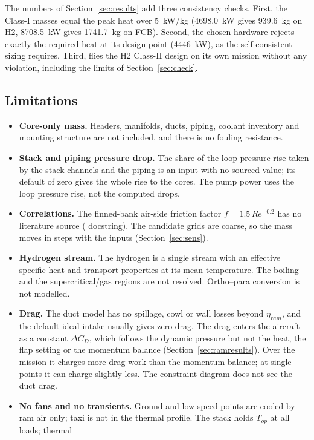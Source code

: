 \documentclass[a4paper,11pt]{article}
\begin{document}
The numbers of Section~\ref{sec:results} add three consistency checks. First, the Class-I
masses equal the peak heat over \SI{5}{kW/kg} (\SI{4698.0}{kW} gives \SI{939.6}{kg} on H2,
\SI{8708.5}{kW} gives \SI{1741.7}{kg} on FCB). Second, the chosen hardware rejects exactly
the required heat at its design point (\SI{4446}{kW}), as the self-consistent sizing
requires. Third,  flies the H2 Class-II design on its own mission
without any violation, including the limits of Section~\ref{sec:check}.

\subsection{Limitations}
\begin{itemize}
\item \textbf{Core-only mass.} Headers, manifolds, ducts, piping, coolant inventory and
  mounting structure are not included, and there is no fouling resistance.
\item \textbf{Stack and piping pressure drop.} The share of the loop pressure rise taken by
  the stack channels and the piping is an input with no sourced value; its default of zero
  gives the whole rise to the cores. The pump power uses the loop pressure rise, not the
  computed drops.
\item \textbf{Correlations.} The finned-bank air-side friction factor
  $f = 1.5\,Re^{-0.2}$ has no literature source ( docstring). The candidate
  grids are coarse, so the mass moves in steps with the inputs
  (Section~\ref{sec:sens}).
\item \textbf{Hydrogen stream.} The hydrogen is a single stream with an effective specific
  heat and transport properties at its mean temperature. The boiling and the
  supercritical/gas regions are not resolved. Ortho--para conversion is not modelled.
\item \textbf{Drag.} The duct model has no spillage, cowl or wall losses beyond
  $\eta_{ram}$, and the default ideal intake usually gives zero drag. The drag enters the
  aircraft as a constant $\Delta C_D$, which follows the dynamic pressure but not the
  heat, the flap setting or the momentum balance (Section~\ref{sec:ramresults}). Over the
  mission it charges more drag work than the momentum balance; at single points it can charge
  slightly less. The constraint diagram does not see the duct drag.
\item \textbf{No fans and no transients.} Ground and low-speed points are cooled by ram air
  only; taxi is not in the thermal profile. The stack holds $T_{op}$ at all loads; thermal

\end{itemize}
\end{document}
